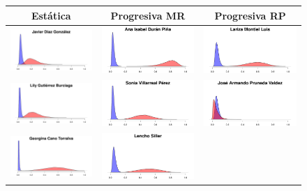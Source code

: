 \documentclass[letter,12pt]{article}
\begin{document}
\begin{figure}
  \centering
  \begin{tabular}{ccc}
    Estática & Progresiva MR & Progresiva RP \\ \hline
    \includegraphics[width=.3\columnwidth]{../graphs/prReconoce1.pdf} &
    \includegraphics[width=.3\columnwidth]{../graphs/prReconoce4.pdf} &
    \includegraphics[width=.3\columnwidth]{../graphs/prReconoce6.pdf} \\
    \includegraphics[width=.3\columnwidth]{../graphs/prReconoce2.pdf} &
    \includegraphics[width=.3\columnwidth]{../graphs/prReconoce5.pdf} &
    \includegraphics[width=.3\columnwidth]{../graphs/prReconoce7.pdf} \\
    \includegraphics[width=.3\columnwidth]{../graphs/prReconoce3.pdf} &
    \includegraphics[width=.3\columnwidth]{../graphs/prReconoce9.pdf} &

\end{tabular}
\end{figure}
\end{document}
